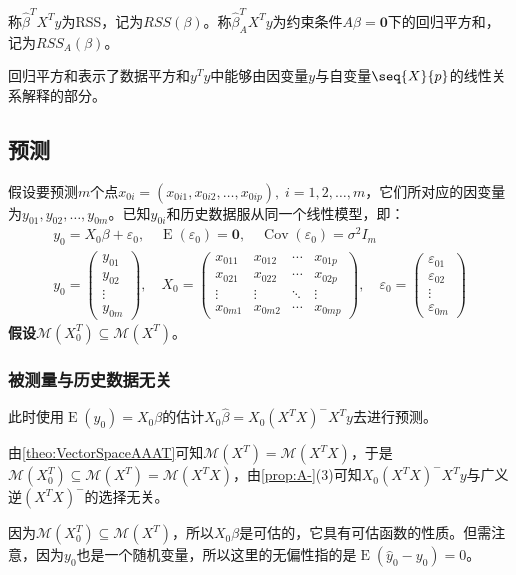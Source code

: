 \begin{definition}
	称$\hat{\beta}^TX^Ty$为\gls{RSS}，记为$RSS(\beta)$。称$\hat{\beta}_A^TX^Ty$为约束条件$A\beta=\mathbf{0}$下的回归平方和，记为$RSS_A(\beta)$。
\end{definition}
\begin{note}
	回归平方和表示了数据平方和$y^Ty$中能够由因变量$y$与自变量$\seq{X}{p}$的线性关系解释的部分。
\end{note}

\subsection{预测}
\label{def:LinearModelForcast}
假设要预测$m$个点$x_{0i}=(x_{0i1},x_{0i2},\dots,x_{0ip}),\;i=1,2,\dots,m$，它们所对应的因变量为$y_{01},y_{02},\dots,y_{0m}$。已知$y_{0i}$和历史数据服从同一个线性模型，即：
\begin{gather*}
	y_0=X_0\beta+\varepsilon_0,\quad\operatorname{E}(\varepsilon_0)=\mathbf{0},\quad\operatorname{Cov}(\varepsilon_0)=\sigma^2I_m \\
	y_0=
	\begin{pmatrix}
		y_{01} \\
		y_{02} \\
		\vdots \\
		y_{0m}
	\end{pmatrix},\quad
	X_0=
	\begin{pmatrix}
		x_{011} & x_{012} & \cdots & x_{01p} \\
		x_{021} & x_{022} & \cdots & x_{02p} \\
		\vdots & \vdots & \ddots & \vdots \\
		x_{0m1} & x_{0m2} & \cdots & x_{0mp} 
	\end{pmatrix},\quad
	\varepsilon_0=
	\begin{pmatrix}
		\varepsilon_{01} \\
		\varepsilon_{02} \\
		\vdots \\
		\varepsilon_{0m}
	\end{pmatrix}
\end{gather*}
\textbf{假设$\mathcal{M}(X_0^T)\subseteq\mathcal{M}(X^T)$}。
\subsubsection{被测量与历史数据无关}
\begin{derivation}
	此时使用$\operatorname{E}(y_0)=X_0\beta$的估计$X_0\hat{\beta}=X_0(X^TX)^-X^Ty$去进行预测。\par
	由\cref{theo:VectorSpaceAAAT}可知$\mathcal{M}(X^T)=\mathcal{M}(X^TX)$，于是$\mathcal{M}(X_0^T)\subseteq\mathcal{M}(X^T)=\mathcal{M}(X^TX)$，由\cref{prop:A-}(3)可知$X_0(X^TX)^-X^Ty$与广义逆$(X^TX)^-$的选择无关。\par
	因为$\mathcal{M}(X_0^T)\subseteq\mathcal{M}(X^T)$，所以$X_0\beta$是可估的，它具有可估函数的性质。但需注意，因为$y_0$也是一个随机变量，所以这里的无偏性指的是$\operatorname{E}(\hat{y}_0-y_0)=0$。
\end{derivation}
